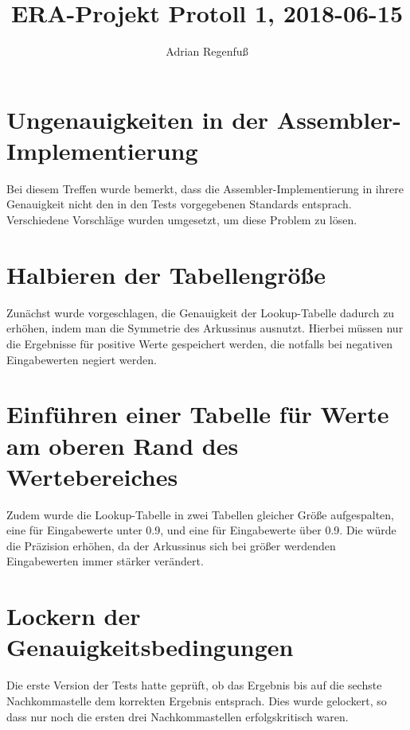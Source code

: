 \documentclass{article}
\title{ERA-Projekt Protoll 1, 2018-06-15}
\author{Adrian Regenfuß}
\begin{document}
\maketitle

\section{Ungenauigkeiten in der Assembler-Implementierung}

Bei diesem Treffen wurde bemerkt, dass die Assembler-Implementierung
in ihrere Genauigkeit nicht den in den Tests vorgegebenen Standards
entsprach. Verschiedene Vorschläge wurden umgesetzt, um diese Problem
zu lösen.

\section{Halbieren der Tabellengröße}

 Zunächst wurde vorgeschlagen, die Genauigkeit der Lookup-Tabelle
dadurch zu erhöhen, indem man die Symmetrie des Arkussinus ausnutzt.
Hierbei müssen nur die Ergebnisse für positive Werte gespeichert werden,
die notfalls bei negativen Eingabewerten negiert werden.

\section{Einführen einer Tabelle für Werte am oberen Rand des Wertebereiches}

Zudem wurde die Lookup-Tabelle in zwei Tabellen gleicher Größe aufgespalten,
eine für Eingabewerte unter 0.9, und eine für Eingabewerte über 0.9.
Die würde die Präzision erhöhen, da der Arkussinus sich bei größer werdenden
Eingabewerten immer stärker verändert.

\section{Lockern der Genauigkeitsbedingungen}

Die erste Version der Tests hatte geprüft, ob das Ergebnis bis auf die
sechste Nachkommastelle dem korrekten Ergebnis entsprach. Dies wurde gelockert,
so dass nur noch die ersten drei Nachkommastellen erfolgskritisch waren.
\end{document}
